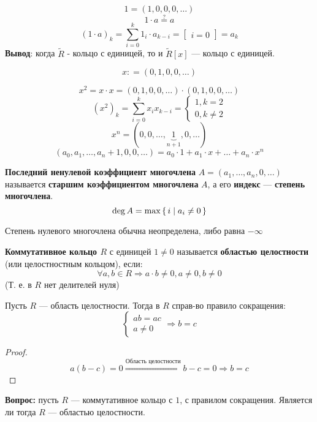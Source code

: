 \[
1 = (1, 0, 0, 0, \ldots)
\]
\[
1 \cdot a \overset{?}{=} a
\]
\[
  (1 \cdot a)_k = \sum_{i = 0}^{k} 1_{i} \cdot a_{k - i} = \begin{bmatrix}i = 0 \end{bmatrix} = a_k
\]
\textbf{Вывод}: когда $\tilde{R}$ - кольцо с единицей, то и $\tilde{R}[x]$ --- кольцо с единицей.
\begin{definition}
\[
x \colon= (0, 1, 0, 0, \ldots)
\]
\end{definition}
\[
x^{2} = x \cdot x = (0, 1, 0, 0, \ldots) \cdot (0, 1, 0, 0, \ldots)
\]
\[
  (x^{2})_k = \sum_{i = 0}^{k} x_i x_{k - i} = \begin{cases}
  1, k = 2 \\
  0, k \neq 2
  \end{cases}
\]
\[
  x^{n} = (0, 0, \ldots, \underbrace{1}_{n + 1}, 0, \ldots)
\]
\[
  (a_0, a_1, \ldots, a_n + 1, 0, 0, \ldots) = a_0 \cdot 1 + a_1 \cdot x + \ldots + a_{n} \cdot x^{n}
\]
\begin{definition}
\textbf{Последний ненулевой коэффициент многочлена} $A = (a_1, \ldots, a_n, 0, \ldots)$ называется \textbf{старшим коэффициентом многочлена} $A$, а его \textbf{индекс} --- \textbf{степень многочлена}.
\[
\deg A = \max \set{i | a_i \neq 0}
\]
\end{definition}
\begin{note}
Степень нулевого многочлена обычна неопределена, либо равна $-\infty$
\end{note}

\begin{definition}
\textbf{Коммутативное кольцо $R$} с единицей $1 \neq 0$ называется \textbf{областью целостности} (или целостностным кольцом), если:
\[
\forall a, b \in R \Rightarrow a \cdot b \neq 0, a \neq 0, b \neq 0
\]
(Т. е. в $R$ нет делителей нуля)
\end{definition}
\begin{statement}
  \label{statement:01_2}
Пусть $R$ --- область целостности. Тогда в $R$ справ-во правило сокращения:
\[
\begin{cases}
ab = ac \\
a \neq 0
\end{cases} \Rightarrow b = c
\]
\end{statement}
\begin{proof}
\[
a(b - c) = 0 \overset{\text{Область целостности}}{\Rightarrow} b - c = 0 \Rightarrow b = c
\]
\end{proof}
\textbf{Вопрос:} пусть $R$ --- коммутативное кольцо с $1$, с правилом сокращения. Является ли тогда $R$ --- областью целостности.

